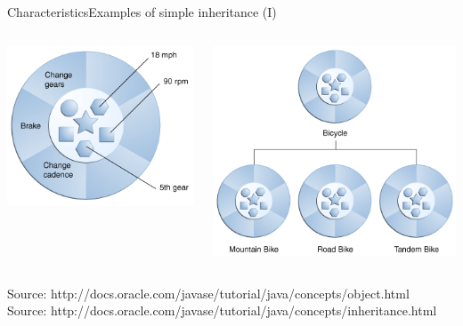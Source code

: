 \documentclass[10pt,compress]{beamer} %
\begin{document}
\begin{frame}{Characteristics}{Examples of simple inheritance (I)}
    \begin{columns}
	    \centering\includegraphics[width=0.9\linewidth]{figs/concepts-bicycleObject2}
	  
	  \centering \includegraphics[width=0.9\linewidth]{figs/concepts-bikeHierarchy2}\\
	
    \end{columns}
    \bigskip
	\centering \tiny{Source: http://docs.oracle.com/javase/tutorial/java/concepts/object.html}\\
	\centering \tiny{Source: http://docs.oracle.com/javase/tutorial/java/concepts/inheritance.html}\\
\end{frame}
\end{document}
